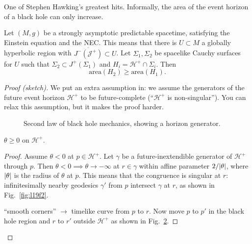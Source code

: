One of Stephen Hawking's greatest hits.
Informally, the area of the event horizon of a black hole can only increase.
\begin{theorem}[Hawking '72]
  Let $(M, g)$ be a strongly asymptotic predictable spacetime, satisfying the Einstein equation and the NEC.
  This means that there is $U \subset M$ a globally hyperbolic region with $\overline{J^- (\mathcal{J}^+)}{} \subset U$. Let $\Sigma_1, \Sigma_2$ be spacelike Cauchy surfaces for $U$ such that $\Sigma_2 \subset J^+(\Sigma_1)$ and $H_i = \mathcal{H}^+ \cap \Sigma_i$. Then
  \begin{equation}
    \text{area}(H_2) \geq \text{area}(H_1).
  \end{equation}
\end{theorem}
\begin{proof}[Proof (sketch)]
  We put an extra assumption in: we assume the generators of the future event horizon $\mathcal{H}^+$ to be future-complete (``$\mathcal{H}^+$ is non-singular'').
  You can relax this assumption, but it makes the proof harder.
  \begin{figure}[ht]
    \centering
    \caption{Second law of black hole mechanics, showing a horizon generator.}
    \label{fig:l19f1}
  \end{figure}
  \begin{claim}
    $\theta \geq 0$ on $\mathcal{H}^+$.
  \end{claim}
  \begin{proof}
    Assume $\theta < 0$ at $p \in \mathcal{H}^+$.
    Let $\gamma$ be a future-inextendible generator of $\mathcal{H}^+$ through $p$.
    Then $\theta < 0 \implies \theta \to -\infty$ at $r \in \gamma$ within affine parameter $2 / \abs{\theta}$, where $\abs{\theta}$ is the radius of $\theta$ at $p$.
    This means that the congruence is singular at $r$: infinitesimally nearby geodesics $\gamma'$ from $p$ intersect $\gamma$ at $r$, as shown in Fig.~\ref{fig:l19f2}.
  \begin{figure}[tbhp]
    \begin{minipage}[t]{0.5\textwidth}
      \centering
      \caption{}
      \label{fig:l19f2}
    \end{minipage}%
    \begin{minipage}[t]{0.5\textwidth}
      \centering
      \caption{}
      \label{fig:l19f3}
    \end{minipage}
  \end{figure}
  ``smooth corners'' $\to $ timelike curve from $p$ to $r$. Now move $p$ to $p'$ in the black hole region and $r$ to $r'$ outside $\mathcal{H}^+$ as shown in Fig.~\ref{fig:l19f3}.

\end{proof}
\end{proof}
